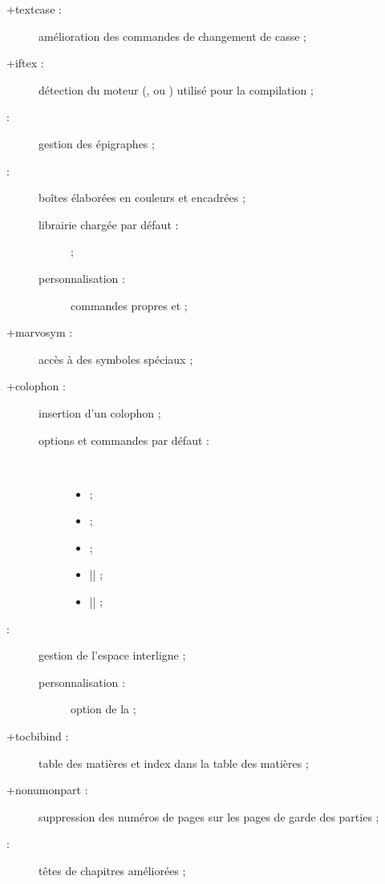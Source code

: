 \begin{description}
\item[\package*+{textcase} :] amélioration des commandes de changement de
  casse ;
\item[\package+{iftex} :] détection du moteur (, 
  ou ) utilisé pour la compilation ;
\item[ :] gestion des épigraphes ;
\item[ :] boîtes élaborées en couleurs et encadrées ;
  \begin{description}
  \item[librairie chargée par défaut :]  ;
  \item[personnalisation :] commandes propres  et
     ;
  \end{description}
\item[\package+{marvosym} :] accès à des symboles spéciaux ;
\item[\package+{colophon} :] insertion d'un colophon ;
  \begin{description}
  \item[options et commandes par défaut :]\
    \begin{itemize}
    \item {} ;
    \item {} ;
    \item {} ;
    \item |\colophonpreparhook{\normalsize}| ;
    \item |\colophonpretitlehook{\Large}| ;
    \end{itemize}
  \end{description}
\item[ :] gestion de l'espace
  interligne ;
  \begin{description}
  \item[personnalisation :] option  de la \yatCl ;
  \end{description}
\item[\package*+{tocbibind} :] table des matières et index dans la table des
  matières ;
\item[\package*+{nonumonpart} :] suppression des numéros de pages sur les pages
  de garde des parties ;
\item[ :] %
  têtes de chapitres améliorées ;

\end{description}
